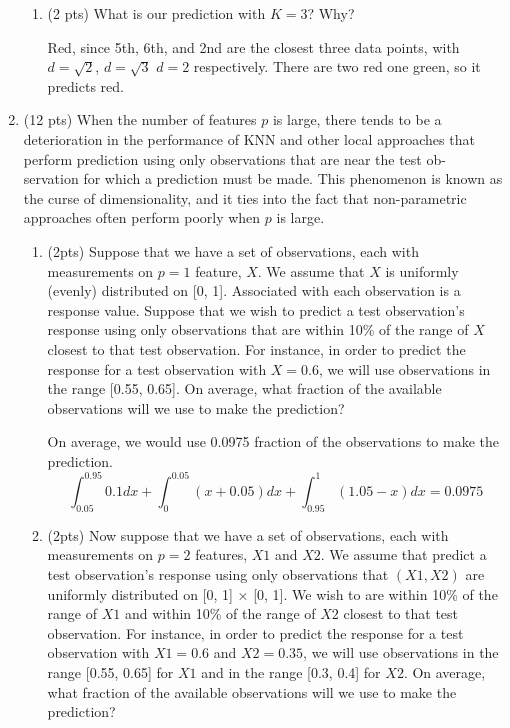 \documentclass[a4paper]{article}
\theoremstyle{definition}
\newenvironment{soln}{
    \leavevmode\color{blue}\ignorespaces
}{}
\begin{document}
\begin{enumerate}
\begin{enumerate}
	\item (2 pts) What is our prediction with $K=3$? Why?
	
	\begin{soln} Red, since 5th, 6th, and 2nd are the closest three data points, with $d=\sqrt{2}$, $d=\sqrt{3}$ $d=2$ respectively. There are two red one green, so it predicts red.\end{soln}

\end{enumerate}

\item (12 pts) When the number of features $p$ is large, there tends to be a deterioration in the performance of KNN and other local approaches that perform prediction using only observations that are near the test ob- servation for which a prediction must be made. This phenomenon is known as the curse of dimensionality, and it ties into the fact that non-parametric approaches often perform poorly when $p$ is large.

\begin{enumerate}
	\item (2pts) Suppose that we have a set of observations, each with measurements on $p=1$ feature, $X$. We assume that $X$ is uniformly (evenly) distributed on [0, 1]. Associated with each observation is a response value. Suppose that we wish to predict a test observation’s response using only observations that are within 10\% of the range of $X$ closest to that test observation. For instance, in order to predict the response for a test observation with $X=0.6$, we will use observations in the range [0.55, 0.65]. On average, what fraction of the available observations will we use to make the prediction?
	
	\begin{soln}  On average, we would use 0.0975 fraction of the observations to make the prediction.
 $$\int_{0.05}^{0.95} 0.1 dx +\int_{0}^{0.05} (x+0.05) dx + \int_{0.95}^{1} (1.05-x) dx = 0.0975$$
 
 \end{soln}
	
	
	\item (2pts) Now suppose that we have a set of observations, each with measurements on $p =2$ features, $X1$ and $X2$. We assume that predict a test observation’s response using only observations that $(X1,X2)$ are uniformly distributed on [0, 1] × [0, 1]. We wish to are within 10\% of the range of $X1$ and within 10\% of the range of $X2$ closest to that test observation. For instance, in order to predict the response for a test observation with $X1 =0.6$ and $X2 =0.35$, we will use observations in the range [0.55, 0.65] for $X1$ and in the range [0.3, 0.4] for $X2$. On average, what fraction of the available observations will we use to make the prediction?
	

\end{enumerate}
\end{enumerate}
\end{document}
